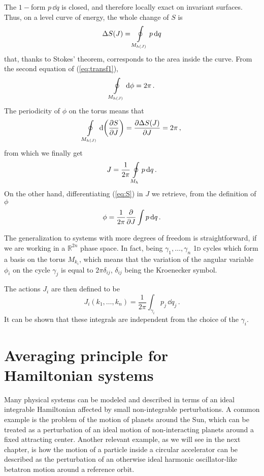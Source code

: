 The $1-$form $p\,\dd q$ is closed, and therefore locally exact on invariant surfaces. Thus, on a level curve of energy, the whole change of $S$ is
%
\begin{equation} \Delta S(J) = \oint\displaylimits_{M_{h(J)}} p\, \dd q \end{equation} 
%
that, thanks to Stokes' theorem, corresponds to the area inside the curve.  From the second equation of (\ref{eq:transf1}),
%
\begin{equation} \oint\displaylimits_{M_{h(J)}} \dd\phi = 2\pi\,.  \end{equation} 
%
The periodicity of $\phi$ on the torus means that
%
\begin{equation} \oint\displaylimits_{M_{h(J)}} \dd\qty(\pdv{S}{J}) = \pdv{\Delta S(J)}{J} = 2\pi\,, \end{equation}
%
from which we finally get
%
\begin{equation}  J = \frac{1}{2\pi}\oint\displaylimits_{M_h} p\,\dd q\,.  \end{equation} 
%
On the other hand, differentiating (\ref{eq:S}) in $J$ we retrieve, from the definition of $\phi$
%
\begin{equation} \phi = \frac{1}{2\pi} \pdv{J}\int p\,\dd q\, . \end{equation}  

The generalization to systems with more degrees of freedom is straightforward, if we are working in a $\mathbb{R}^{2n}$ phase space. In fact, being $\gamma_1,\dots, \gamma_n$ 1\textsc{d} cycles which form a basis on the torus $M_{k_i}$, which means that the variation of the angular variable $\phi_i$ on the cycle $\gamma_j$ is equal to $2\pi\delta_{ij}$,  $\delta_{ij}$ being the Kroenecker symbol.

The actions $J_i$ are then defined to be
%
\begin{equation} J_i(k_1,\dots,k_n) = \frac{1}{2\pi}\int_{\gamma_i} p_j\, \dd q_j\, .  \end{equation} 
%
It can be shown that these integrals are independent from the choice of the $\gamma_i$.~\cite{Arnold:937549}

\section{Averaging principle for Hamiltonian systems}\label{sec:1:averaging}

Many physical systems can be modeled and described in terms of an ideal integrable Hamiltonian affected by small non-integrable perturbations. A common example is the problem of the motion of planets around the Sun, which can be treated as a perturbation of an ideal motion of non-interacting planets around a fixed attracting center. Another relevant example, as we will see in the next chapter, is how the motion of a particle inside a circular accelerator can be described as the perturbation of an otherwise ideal harmonic oscillator-like betatron motion around a reference orbit.

